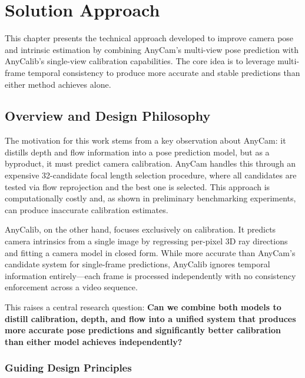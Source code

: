 
\chapter{Solution Approach}\label{chapter:solution-approach}

This chapter presents the technical approach developed to improve camera pose and intrinsic estimation by combining AnyCam's multi-view pose prediction with AnyCalib's single-view calibration capabilities. The core idea is to leverage multi-frame temporal consistency to produce more accurate and stable predictions than either method achieves alone.

\section{Overview and Design Philosophy}\label{sec:solution-overview}

The motivation for this work stems from a key observation about AnyCam: it distills depth and flow information into a pose prediction model, but as a byproduct, it must predict camera calibration. AnyCam handles this through an expensive 32-candidate focal length selection procedure, where all candidates are tested via flow reprojection and the best one is selected. This approach is computationally costly and, as shown in preliminary benchmarking experiments, can produce inaccurate calibration estimates.

AnyCalib, on the other hand, focuses exclusively on calibration. It predicts camera intrinsics from a single image by regressing per-pixel 3D ray directions and fitting a camera model in closed form. While more accurate than AnyCam's candidate system for single-frame predictions, AnyCalib ignores temporal information entirely---each frame is processed independently with no consistency enforcement across a video sequence.

This raises a central research question: \textbf{Can we combine both models to distill calibration, depth, and flow into a unified system that produces more accurate pose predictions and significantly better calibration than either model achieves independently?}

\subsection{Guiding Design Principles}


